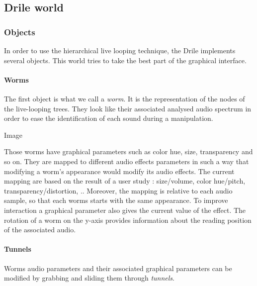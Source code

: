 \subsection{Drile world} 
 \subsubsection{Objects}
 In order to use the hierarchical live looping technique, the Drile implements several objects. This world tries to take the best part of the graphical interface.
\paragraph{Worms}    
 The first object is what we call a \textit{worm}. It is the representation of the nodes of the live-looping trees. They look like their associated analysed audio spectrum in order to ease the identification of each sound during a manipulation.
 
  Image
  
Those worms have graphical parameters such as color hue, size, transparency and so on. They are mapped to different audio effects parameters in such a way that modifying a worm's appearance would modify its audio effects. The current mapping are based on the result of a user study : size/volume, color hue/pitch, transparency/distortion, .. Moreover, the mapping is relative to each audio sample, so that each worms starts with the same appearance. To improve interaction a graphical parameter also gives the current value of the effect. The rotation of a worm on the y-axis provides information about the reading position of the associated audio.

\paragraph{Tunnels}    
Worms audio parameters and their associated graphical parameters can be modified by grabbing and sliding them through \textit{tunnels}.

  
